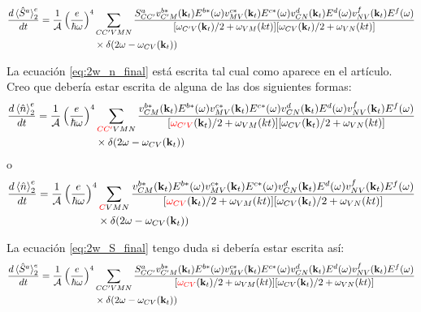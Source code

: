 \documentclass{article}
\newcommand{\kt}{\mathbf{k}_{t}}
\newcommand{\dw}{\delta(2\omega - \omega_{CV}(\kt))}
\begin{document}
\begin{equation}\label{eq:2w_S_final}
\begin{split}
\frac{d\ev*{\hat{S}^{a}}^{e}_2}{dt}= \frac{1}{\mathcal{A}} \left(\frac{e}{\hbar\omega}\right)^{4} &
\sum_{CC'VMN} \frac{S^{a}_{CC'} v^{b*}_{C'M}(\kt) E^{b*}(\omega)v^{c*}_{MV}(\kt) E^{c*}(\omega)
v^{d}_{CN}(\kt) E^{d}(\omega)v^{f}_{NV}(\kt) E^{f}(\omega)}
{[\omega_{C'V}(\kt)/2+\omega_{VM}(kt)][\omega_{CV}(\kt)/2+\omega_{VN}(kt)]} \\
& \times \dw 
\end{split}
\end{equation}

{\color{blue} La ecuaci\'on \eqref{eq:2w_n_final} est\'a escrita tal cual
como aparece en el art\'iculo. Creo que deber\'ia estar escrita de alguna de las 
dos siguientes formas:
\begin{equation*}
\begin{split}
\frac{d\ev*{\hat{n}}^{e}_2}{dt} = \frac{1}{\mathcal{A}} \left(\frac{e}{\hbar\omega}\right)^{4} &
\sum_{{\color{red}CC'}VMN} \frac{v^{b*}_{CM}(\kt) E^{b*}(\omega)v^{c*}_{MV}(\kt) E^{c*}(\omega)
v^{d}_{CN}(\kt) E^{d}(\omega)v^{f}_{NV}(\kt) E^{f}(\omega)}
{[{\color{red}\omega_{C'V}}(\kt)/2+\omega_{VM}(kt)][\omega_{CV}(\kt)/2+\omega_{VN}(kt)]} \\
& \times \dw
\end{split}
\end{equation*}
o
\begin{equation*}
\begin{split}
\frac{d\ev*{\hat{n}}^{e}_2}{dt} = \frac{1}{\mathcal{A}} \left(\frac{e}{\hbar\omega}\right)^{4} &
\sum_{{\color{red}C}VMN} \frac{v^{b*}_{CM}(\kt) E^{b*}(\omega)v^{c*}_{MV}(\kt) E^{c*}(\omega)
v^{d}_{CN}(\kt) E^{d}(\omega)v^{f}_{NV}(\kt) E^{f}(\omega)}
{[{\color{red}\omega_{CV}}(\kt)/2+\omega_{VM}(kt)][\omega_{CV}(\kt)/2+\omega_{VN}(kt)]} \\
& \times \dw
\end{split}
\end{equation*}

La ecuaci\'on \eqref{eq:2w_S_final} tengo duda si deber\'ia estar escrita as\'i:
\begin{equation}
\begin{split}
\frac{d\ev*{\hat{S}^{a}}^{e}_2}{dt}= \frac{1}{\mathcal{A}} \left(\frac{e}{\hbar\omega}\right)^{4} &
\sum_{CC'VMN} \frac{S^{a}_{CC'} v^{b*}_{C'M}(\kt) E^{b*}(\omega)v^{c*}_{MV}(\kt) E^{c*}(\omega)
v^{d}_{CN}(\kt) E^{d}(\omega)v^{f}_{NV}(\kt) E^{f}(\omega)}
{[{\color{red}\omega_{CV}}(\kt)/2+\omega_{VM}(kt)][\omega_{CV}(\kt)/2 + \omega_{VN}(kt)]} \\
& \times \dw 
\end{split}
\end{equation}
}
\end{document}
